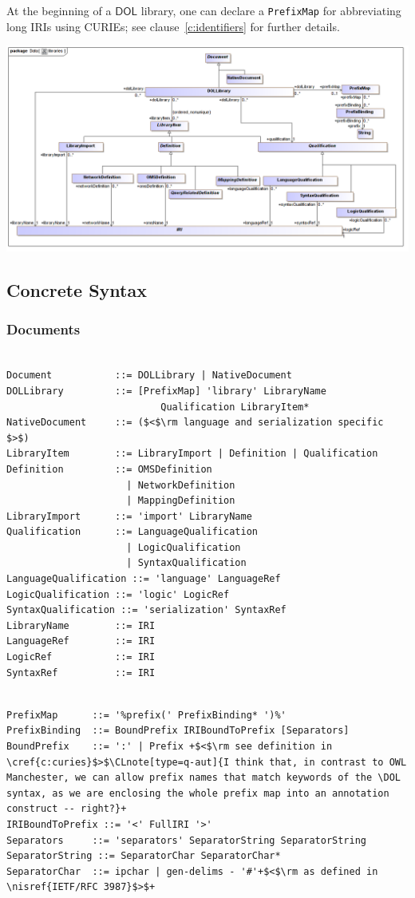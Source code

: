 \documentclass[10pt,fleqn,final]{scrreprt}
\makeatletter
\newcommand*\CommentAuthor{}
\renewcommand*\CommentAuthor{#1}}
\newcommand*\CommentDate{}
\renewcommand*\CommentDate{#1}}
\newcommand*\CommentId{}
\renewcommand*\CommentId{#1}}
\newcommand*\CommentType{}
\renewcommand*\CommentType{#1}}
\newcommand*{\SetCommentColorByType}[1]{%
\edef\localType{{#1}}%
\expandafter\ifstrequal\localType{q-aut}{\colorlet{CommentColor}{red}}{%
\expandafter\ifstrequal\localType{q-all}{\colorlet{CommentColor}{orange}}{%
\expandafter\ifstrequal\localType{todo}{\colorlet{CommentColor}{orange}}{%
\expandafter\ifstrequal\localType{fyi}{\colorlet{CommentColor}{lightgray}}{%
\colorlet{CommentColor}{yellow}}}}}}
\newcommand*{\SetCommentPrefixByType}[1]{%
\edef\localType{{#1}}%
\expandafter\@ifmtarg\localType{%
\edef\CommentPrefix{}%
}{%
\caseupper[q]{#1}%
\edef\CommentPrefix{\thestring: }%
}}
\newcommand*{\initComment}[1]{%
\setkeys{Comment}{#1}%
\SetCommentColorByType{\CommentType}%
\relax%
\SetCommentPrefixByType{\CommentType}%
\relax%
}
\newcommand*{\todonote}[2][]{%
\initComment{#1}%
\pdfcomment[author=\CommentAuthor,color=CommentColor,date=\CommentDate,id=\CommentId]{%
\CommentPrefix
#2}}
\renewcommand*{\todonote}[2][]{%
\initComment{#1}%
\ednote{\CommentPrefix #2}}
\newcommand*{\CLnote}[2][author=Christoph Lange]{%
\todonote[author=Christoph Lange,#1]{#2} 
}
\newcommand*{\syntax}[1]{\texttt{#1}}
\newcommand*{\DOL}{\ensuremath{\mathsf{DOL}}\xspace}
\newcommand{\clauserefname}{clause}
\newcommand{\cref}[1]{\clauserefname~\ref{#1}}
\newcommand{\ssclause}[1]{\subsection{#1}}
\newcommand{\sssclause}[1]{\subsubsection{#1}}
\newcommand{\nisref}[1]{#1}
\newenvironment{definitions}[0]{\medskip }{}
\makeatother
\begin{document}
\begin{definitions}
At the beginning of a \DOL library, one can declare a \syntax{PrefixMap} for abbreviating long IRIs  using CURIEs; see \cref{c:identifiers} for further details.

\medskip
\begin{center}
\includegraphics[scale=0.47]{mof/libraries.png}
\end{center}




\ssclause{Concrete Syntax}

	\sssclause{Documents}
\vspace{-2em}
\begin{lstlisting}[language=ebnf,escapeinside={()},morecomment={[l]{\%\%\ }}]

Document           ::= DOLLibrary | NativeDocument
DOLLibrary         ::= [PrefixMap] 'library' LibraryName
                           Qualification LibraryItem*
NativeDocument     ::= ($<$\rm language and serialization specific $>$) 
LibraryItem        ::= LibraryImport | Definition | Qualification
Definition         ::= OMSDefinition
                     | NetworkDefinition
                     | MappingDefinition
LibraryImport      ::= 'import' LibraryName
Qualification      ::= LanguageQualification
                     | LogicQualification
                     | SyntaxQualification
LanguageQualification ::= 'language' LanguageRef
LogicQualification ::= 'logic' LogicRef
SyntaxQualification ::= 'serialization' SyntaxRef
LibraryName        ::= IRI
LanguageRef        ::= IRI
LogicRef           ::= IRI
SyntaxRef          ::= IRI
\end{lstlisting}


\begin{lstlisting}[language=ebnf,escapechar=+,morecomment={[l]{\%\%\ }}]

PrefixMap      ::= '%prefix(' PrefixBinding* ')%'
PrefixBinding  ::= BoundPrefix IRIBoundToPrefix [Separators]
BoundPrefix    ::= ':' | Prefix +$<$\rm see definition in \cref{c:curies}$>$\CLnote[type=q-aut]{I think that, in contrast to OWL Manchester, we can allow prefix names that match keywords of the \DOL syntax, as we are enclosing the whole prefix map into an annotation construct -- right?}+
IRIBoundToPrefix ::= '<' FullIRI '>'
Separators     ::= 'separators' SeparatorString SeparatorString
SeparatorString ::= SeparatorChar SeparatorChar*
SeparatorChar  ::= ipchar | gen-delims - '#'+$<$\rm as defined in \nisref{IETF/RFC 3987}$>$+
\end{lstlisting}



\end{definitions}
\end{document}
